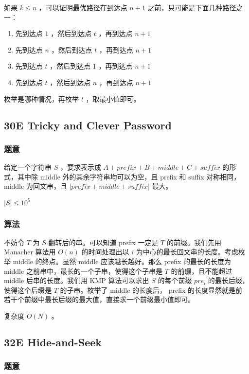 \documentclass[11pt]{article}
\begin{document}
    如果 $k \leq n$ ，可以证明最优路径在到达点 $n + 1$ 之前，只可能是下面几种路径之一：
\begin{enumerate}
\item 先到达点 $1$ ，然后到达点 $t$ ，再到达点 $n + 1$
\item 先到达点 $n$ ，然后到达点 $t$ ，再到达点 $n + 1$
\item 先到达点 $t$ ，然后到达点 $1$ ，再到达点 $n + 1$
\item 先到达点 $t$ ，然后到达点 $n$ ，再到达点 $n + 1$
\end{enumerate}

   枚举是哪种情况，再枚举 $t$ ，取最小值即可。
\subsection{30E   Tricky and Clever Password}
\label{sec-2-5}
\subsubsection{题意}
\label{sec-2-5-1}

    给定一个字符串 $S$ ，要求表示成 $A + prefix + B + middle + C + suffix$ 的形式，其中除 middle 外的其余字符串均可以为空，且 prefix 和 suffix 对称相同， middle 为回文串，且 $|prefix + middle + suffix|$ 最大。

    $|S| \leq 10^5$
\subsubsection{算法}
\label{sec-2-5-2}

    不妨令 $T$ 为 $S$ 翻转后的串。可以知道 prefix 一定是 $T$ 的前缀。我们先用 Manacher 算法用 $O(n)$ 的时间处理出以 $i$ 为中心的最长回文串的长度。考虑枚举 middle 的终点。显然 middle 应该越长越好。那么 prefix 的最长的长度为 middle 之前串中，最长的一个子串，使得这个子串是 $T$ 的前缀，且不能超过 middle 后串的长度。我们用 KMP 算法可以求出 $S$ 的每个前缀 $pre_i$ 的最长后缀，使得这个后缀是 $T$ 的子串。枚举了 middle 的长度后， prefix 的长度显然就是前若干个前缀中最长后缀的最大值，直接求一个前缀最小值即可。

    复杂度 $O(N)$ 。
\subsection{32E   Hide-and-Seek}
\label{sec-2-6}
\subsubsection{题意}
\label{sec-2-6-1}
\end{document}
